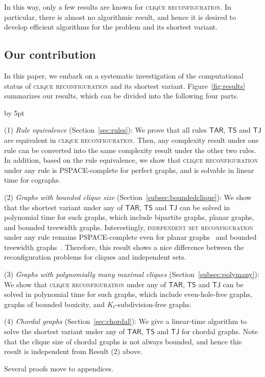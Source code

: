 \documentclass{llncs}
\newcommand{\TS}{\mathsf{TS}}
\newcommand{\TJ}{\mathsf{TJ}}
\newcommand{\TARrule}{\mathsf{TAR}}
\newcounter{one}
\newcounter{two}
\newcounter{four}
\begin{document}
	In this way, only a few results are known for \textsc{clique reconfiguration}. 
	In particular, there is almost no algorithmic result, and hence it is desired to develop efficient algorithms for the problem and its shortest variant. 

\subsection{Our contribution}

	In this paper, we embark on a systematic investigation of the computational status of \textsc{clique reconfiguration} and its shortest variant. 
	Figure~\ref{fig:results} summarizes our results, which can be divided into the following four parts.
\smallskip

\begin{list}{*}{\settowidth{\labelwidth}{(3)}\setlength{\leftmargin}{\labelwidth}\advance \leftmargin by 5pt
	\setlength{\itemsep}{5pt}\setlength{\parsep}{0pt}\setlength{\topsep}{0pt}\setlength{\parskip}{0pt}}
	\item[(1)] \emph{Rule equivalence} (Section~\ref{sec:rules}): We prove that  all rules $\TARrule$, $\TS$ and $\TJ$ are equivalent in \textsc{clique reconfiguration}.
	Then, any complexity result under one rule can be converted into the same complexity result under the other two rules. 
In addition, based on the rule equivalence, we show that \textsc{clique reconfiguration} under any rule is PSPACE-complete for perfect graphs, and is solvable in linear time for cographs.

	\item[(2)] \emph{Graphs with bounded clique size} (Section~\ref{subsec:boundedclique}): We show that the shortest variant under any of $\TARrule$, $\TS$ and $\TJ$ can be solved in polynomial time for such graphs, which include bipartite graphs, planar graphs, and bounded treewidth graphs.
	Interestingly, \textsc{independent set reconfiguration} under any rule remains PSPACE-complete even for planar graphs~\cite{BC09,HearnDemaine2005} and bounded treewidth graphs~\cite{Wro14}. 
	Therefore, this result shows a nice difference between the reconfiguration problems for cliques and independent sets. 

	\item[(3)] \emph{Graphs with polynomially many maximal cliques} (Section~\ref{subsec:polymany}): We  show that \textsc{clique reconfiguration} under any of $\TARrule$, $\TS$ and $\TJ$ can be solved in polynomial time for such graphs, which include even-hole-free graphs, graphs of bounded boxicity, and $K_{t}$-subdivision-free graphs.
	
	\item[(4)] \emph{Chordal graphs} (Section~\ref{sec:chordal}): We give a linear-time algorithm to solve the shortest variant under any of $\TARrule$, $\TS$ and $\TJ$ for chordal graphs.
	Note that the clique size of chordal graphs is not always bounded, and hence this result is independent from Result (2) above. 
\end{list}
	Several proofs move to appendices. 
\end{document}
